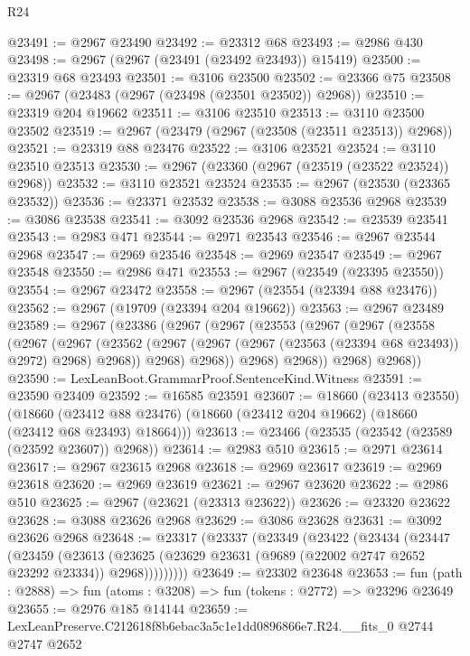 \begin{lexlean}{R24}
\begin{coremodule}
@23491 := @2967 @23490
@23492 := @23312 @68
@23493 := @2986 @430
@23498 := @2967 (@2967 (@23491 (@23492 @23493)) @15419)
@23500 := @23319 @68 @23493
@23501 := @3106 @23500
@23502 := @23366 @75
@23508 := @2967 (@23483 (@2967 (@23498 (@23501 @23502)) @2968))
@23510 := @23319 @204 @19662
@23511 := @3106 @23510
@23513 := @3110 @23500 @23502
@23519 := @2967 (@23479 (@2967 (@23508 (@23511 @23513)) @2968))
@23521 := @23319 @88 @23476
@23522 := @3106 @23521
@23524 := @3110 @23510 @23513
@23530 := @2967 (@23360 (@2967 (@23519 (@23522 @23524)) @2968))
@23532 := @3110 @23521 @23524
@23535 := @2967 (@23530 (@23365 @23532))
@23536 := @23371 @23532
@23538 := @3088 @23536 @2968
@23539 := @3086 @23538
@23541 := @3092 @23536 @2968
@23542 := @23539 @23541
@23543 := @2983 @471
@23544 := @2971 @23543
@23546 := @2967 @23544 @2968
@23547 := @2969 @23546
@23548 := @2969 @23547
@23549 := @2967 @23548
@23550 := @2986 @471
@23553 := @2967 (@23549 (@23395 @23550))
@23554 := @2967 @23472
@23558 := @2967 (@23554 (@23394 @88 @23476))
@23562 := @2967 (@19709 (@23394 @204 @19662))
@23563 := @2967 @23489
@23589 := @2967
    (@23386
      (@2967
        (@2967
          (@23553
            (@2967
              (@2967
                (@23558
                  (@2967
                    (@2967
                      (@23562
                        (@2967 (@2967 (@2967 (@23563 (@23394 @68 @23493)) @2972) @2968) @2968))
                      @2968)
                    @2968))
                @2968)
              @2968))
          @2968)
        @2968))
@23590 := LexLeanBoot.GrammarProof.SentenceKind.Witness
@23591 := @23590 @23409
@23592 := @16585 @23591
@23607 := @18660
    (@23413 @23550)
    (@18660 (@23412 @88 @23476) (@18660 (@23412 @204 @19662) (@18660 (@23412 @68 @23493) @18664)))
@23613 := @23466 (@23535 (@23542 (@23589 (@23592 @23607)) @2968))
@23614 := @2983 @510
@23615 := @2971 @23614
@23617 := @2967 @23615 @2968
@23618 := @2969 @23617
@23619 := @2969 @23618
@23620 := @2969 @23619
@23621 := @2967 @23620
@23622 := @2986 @510
@23625 := @2967 (@23621 (@23313 @23622))
@23626 := @23320 @23622
@23628 := @3088 @23626 @2968
@23629 := @3086 @23628
@23631 := @3092 @23626 @2968
@23648 := @23317
    (@23337
      (@23349
        (@23422
          (@23434
            (@23447
              (@23459
                (@23613
                  (@23625 (@23629 @23631 (@9689 (@22002 @2747 @2652 @23292 @23334)) @2968)))))))))
@23649 := @23302 @23648
@23653 := fun (path : @2888) => fun (atoms : @3208) => fun (tokens : @2772) => @23296 @23649
@23655 := @2976 @185 @14144
@23659 := LexLeanPreserve.C212618f8b6ebac3a5c1e1dd0896866e7.R24.__fits_0 @2744 @2747 @2652

\end{coremodule}
\end{lexlean}
